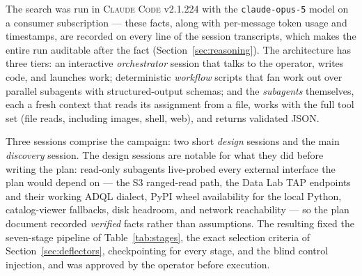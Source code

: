 \documentclass[11pt,letterpaper]{article}
\newcommand{\cc}{\textsc{Claude Code}}
\begin{document}
The search was run in \cc{} v2.1.224 with the \texttt{claude-opus-5} model
\citep{anthropic2025claudecode, anthropic2026opus} on a consumer subscription
--- these facts, along with per-message token usage and timestamps, are
recorded on every line of the session transcripts, which makes the entire run
auditable after the fact (Section~\ref{sec:reasoning}). The architecture has
three tiers: an interactive \emph{orchestrator} session that talks to the
operator, writes code, and launches work; deterministic \emph{workflow}
scripts that fan work out over parallel subagents with structured-output
schemas; and the \emph{subagents} themselves, each a fresh context that reads
its assignment from a file, works with the full tool set (file reads,
including images, shell, web), and returns validated JSON.

Three sessions comprise the campaign: two short \emph{design} sessions and the
main \emph{discovery} session. The design sessions are notable for what they
did before writing the plan: read-only subagents live-probed every external
interface the plan would depend on --- the S3 ranged-read path, the Data Lab
TAP endpoints and their working ADQL dialect, PyPI wheel availability for the
local Python, catalog-viewer fallbacks, disk headroom, and network
reachability --- so the plan document recorded \emph{verified} facts rather
than assumptions. The resulting  fixed the seven-stage pipeline
of Table~\ref{tab:stages}, the exact selection criteria of
Section~\ref{sec:deflectors}, checkpointing for every stage, and the blind
control injection, and was approved by the operator before execution.
\end{document}
